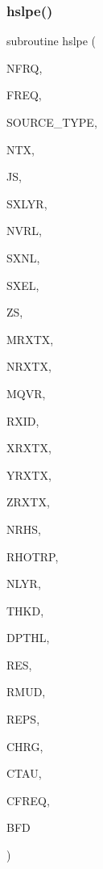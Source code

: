 \subsubsection{\texorpdfstring{hslpe()}{hslpe()}}
{\footnotesize\ttfamily subroutine hslpe (\begin{DoxyParamCaption}\item[{integer}]{N\+F\+RQ,  }\item[{real, dimension(nfrq)}]{F\+R\+EQ,  }\item[{integer}]{S\+O\+U\+R\+C\+E\+\_\+\+T\+Y\+PE,  }\item[{integer}]{N\+TX,  }\item[{integer}]{JS,  }\item[{integer}]{S\+X\+L\+YR,  }\item[{integer}]{N\+V\+RL,  }\item[{real, dimension(nvrl)}]{S\+X\+NL,  }\item[{real, dimension(nvrl)}]{S\+X\+EL,  }\item[{real(kind=ql)}]{ZS,  }\item[{integer}]{M\+R\+X\+TX,  }\item[{integer, dimension(ntx)}]{N\+R\+X\+TX,  }\item[{integer}]{M\+Q\+VR,  }\item[{integer, dimension(mrxtx,ntx)}]{R\+X\+ID,  }\item[{real, dimension(mrxtx,ntx,mqvr)}]{X\+R\+X\+TX,  }\item[{real, dimension(mrxtx,ntx,mqvr)}]{Y\+R\+X\+TX,  }\item[{real, dimension(mrxtx,ntx)}]{Z\+R\+X\+TX,  }\item[{integer}]{N\+R\+HS,  }\item[{real, dimension(nrhs)}]{R\+H\+O\+T\+RP,  }\item[{integer}]{N\+L\+YR,  }\item[{real(kind=ql), dimension(nlyr)}]{T\+H\+KD,  }\item[{real(kind=ql), dimension(nlyr)}]{D\+P\+T\+HL,  }\item[{real, dimension(nlyr)}]{R\+ES,  }\item[{real(kind=ql), dimension(0\+:nlyr)}]{R\+M\+UD,  }\item[{real, dimension(nlyr)}]{R\+E\+PS,  }\item[{real, dimension(nlyr)}]{C\+H\+RG,  }\item[{real, dimension(nlyr)}]{C\+T\+AU,  }\item[{real, dimension(nlyr)}]{C\+F\+R\+EQ,  }\item[{complex, dimension(nfrq,mrxtx,ntx,3)}]{B\+FD }\end{DoxyParamCaption})}

